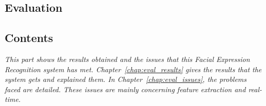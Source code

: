   \begin{titlepage}
    \vspace*{\fill}
      \part{Evaluation}
    \vspace*{\fill}
  \end{titlepage}

\startcontents[parts]
  
\chapter*{Contents}

\textit{This part shows the results obtained and the issues that this Facial Expression Recognition system has met. Chapter~\ref{chap:eval_results} gives the results that the system gets and explained them. In Chapter~\ref{chap:eval_issues}, the problems faced are detailed. These issues are mainly concerning \textit{feature extraction} and \textit{real-time}.}

\vspace{\baselineskip}


\pagebreak


\newpage


\stopcontents[parts]